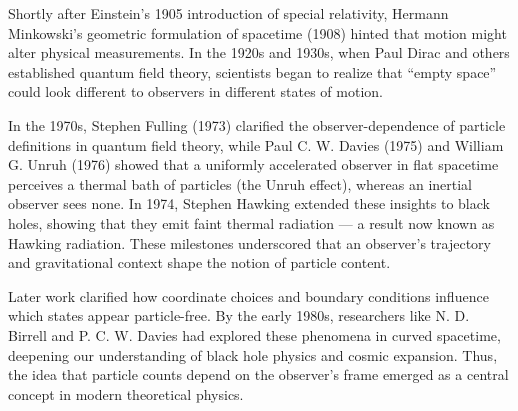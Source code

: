\begin{historical}
Shortly after Einstein’s 1905 introduction of special relativity, Hermann Minkowski’s geometric formulation of spacetime (1908) hinted that motion might alter physical measurements. In the 1920s and 1930s, when Paul Dirac and others established quantum field theory, scientists began to realize that “empty space” could look different to observers in different states of motion.

In the 1970s, Stephen Fulling (1973) clarified the observer-dependence of particle definitions in quantum field theory, while Paul C. W. Davies (1975) and William G. Unruh (1976) showed that a uniformly accelerated observer in flat spacetime perceives a thermal bath of particles (the Unruh effect), whereas an inertial observer sees none. In 1974, Stephen Hawking extended these insights to black holes, showing that they emit faint thermal radiation — a result now known as Hawking radiation. These milestones underscored that an observer’s trajectory and gravitational context shape the notion of particle content.

Later work clarified how coordinate choices and boundary conditions influence which states appear particle-free. By the early 1980s, researchers like N. D. Birrell and P. C. W. Davies had explored these phenomena in curved spacetime, deepening our understanding of black hole physics and cosmic expansion. Thus, the idea that particle counts depend on the observer’s frame emerged as a central concept in modern theoretical physics.
\end{historical}